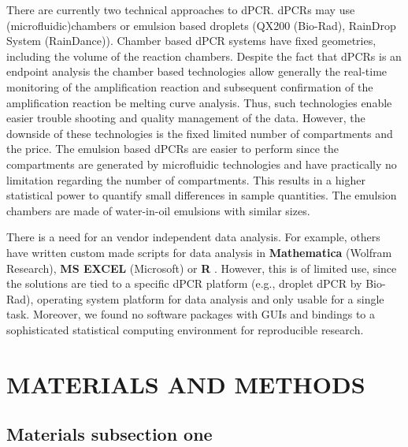 \documentclass[a4,center,fleqn]{NAR}
\begin{document}
There are currently two technical approaches to dPCR. dPCRs may use		%
(microfluidic)chambers or emulsion based droplets 
(QX200 \texttrademark (Bio-Rad), RainDrop \texttrademark System (RainDance)). 
Chamber based dPCR systems have fixed geometries, including the volume of the 
reaction chambers. Despite the fact that dPCRs is an endpoint analysis the 
chamber based technologies allow generally the real-time monitoring of the 
amplification reaction and subsequent confirmation of the amplification reaction 
be melting curve analysis. Thus, such technologies enable easier trouble 
shooting and quality management of the data. However, the downside of these 
technologies is the fixed limited number of compartments and the price. The 
emulsion based dPCRs are easier to perform since the compartments are generated 
by microfluidic technologies and have practically no limitation regarding the 
number of compartments. This results in a higher statistical power to quantify 
small differences in sample quantities. The emulsion chambers are made of 
water-in-oil emulsions with similar sizes.

There is a need for an vendor independent data analysis. For example, others 
have written custom made scripts for data analysis in \textbf{Mathematica} 
(Wolfram Research), \textbf{MS EXCEL} (Microsoft) or \textbf{R} 
\cite{strain_highly_2013, dreo_optimising_2014, trypsteen_ddpcrquant_2015, 
dobnik_multiplex_2015}. However, this is of limited use, since the solutions are 
tied to a specific dPCR platform (e.g., droplet dPCR by Bio-Rad), operating 
system platform for data analysis and only usable for a single task. Moreover, 
we found no software packages with GUIs and bindings to a sophisticated 
statistical computing environment for reproducible research. 

\enlargethispage{-65.1pt}


\section{MATERIALS AND METHODS}

\subsection{Materials subsection one}
\end{document}
